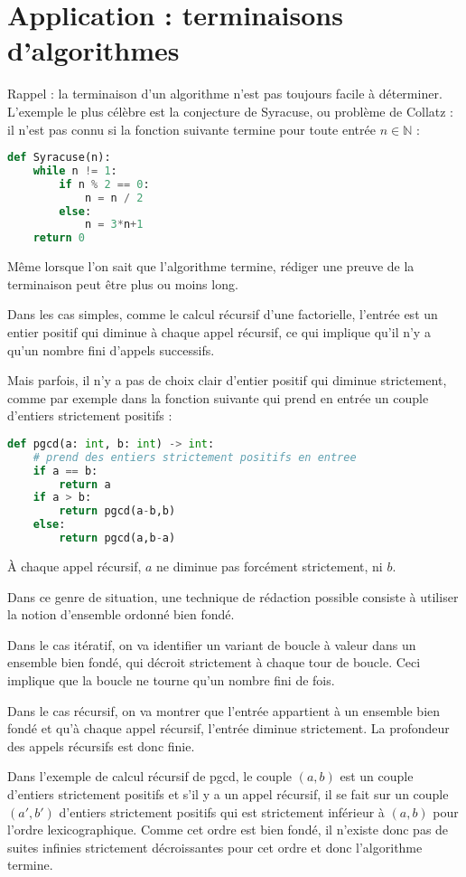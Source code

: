 \documentclass[12pt]{article}
\newcommand{\N}{\mathbb{N}}
\begin{document}
\section{Application : terminaisons d'algorithmes}

Rappel : la terminaison d'un algorithme n'est pas toujours facile à déterminer.
L'exemple le plus célèbre est  la conjecture de Syracuse, ou problème de Collatz : il n'est pas connu si la fonction suivante termine pour toute entrée $n\in\N$ :

\begin{lstlisting}[language=Python]
def Syracuse(n):
	while n != 1:
		if n % 2 == 0:
			n = n / 2
		else:
			n = 3*n+1
	return 0 
\end{lstlisting}

Même lorsque l'on sait que l'algorithme termine, rédiger une preuve de la terminaison peut être plus ou moins long.

Dans les cas simples, comme le calcul récursif d'une factorielle, l'entrée est un entier positif qui diminue à chaque appel récursif, ce qui implique qu'il n'y a qu'un nombre fini d'appels successifs.

Mais parfois, il n'y a pas de choix clair d'entier positif qui diminue strictement, comme par exemple dans la fonction suivante qui prend en entrée un couple d'entiers strictement positifs : 
\begin{lstlisting}[language=Python]
def pgcd(a: int, b: int) -> int:
	# prend des entiers strictement positifs en entree
	if a == b:
		return a
	if a > b:
		return pgcd(a-b,b)
	else:
		return pgcd(a,b-a)
\end{lstlisting}

À chaque appel récursif, $a$ ne diminue pas forcément strictement, ni $b$.

Dans ce genre de situation, une technique de rédaction possible consiste à utiliser la notion d'ensemble ordonné bien fondé.

Dans le cas itératif, on va identifier un variant de boucle à valeur dans un ensemble bien fondé, qui décroit strictement à chaque tour de boucle. Ceci implique que la boucle ne tourne qu'un nombre fini de fois.

Dans le cas récursif, on va montrer que l'entrée appartient à un ensemble  bien fondé et qu'à chaque appel récursif,  l'entrée diminue strictement. La profondeur des appels récursifs est donc finie.

Dans l'exemple de calcul récursif de pgcd, le couple $(a,b)$ est un couple d'entiers strictement positifs et s'il y a un appel récursif, il se fait sur un couple $(a',b')$ d'entiers strictement positifs qui est strictement inférieur à $(a,b)$ pour l'ordre lexicographique. 
Comme cet ordre est bien fondé, il n'existe donc pas de suites infinies strictement décroissantes pour cet ordre et donc l'algorithme termine.
\end{document}
